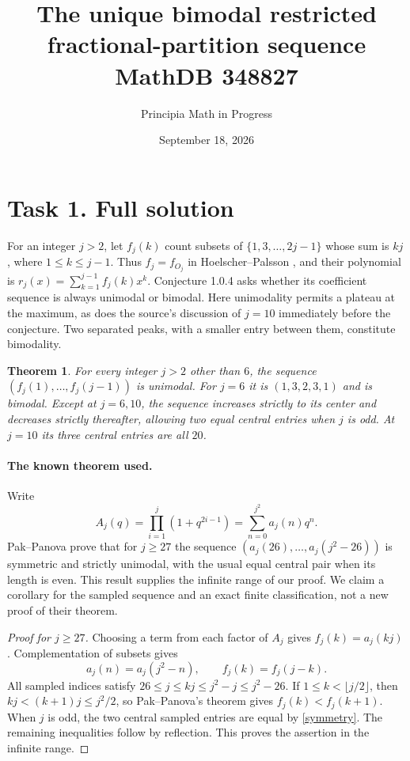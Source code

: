 \documentclass[11pt]{article}
\title{The unique bimodal restricted fractional-partition sequence\\
\large MathDB 348827}
\author{Principia Math in Progress}
\date{September 18, 2026}
\newtheorem{theorem}{Theorem}
\begin{document}
\maketitle

\section*{Task 1. Full solution}
For an integer $j>2$, let $f_j(k)$ count subsets of
$\{1,3,\ldots,2j-1\}$ whose sum is $kj$, where $1\le k\le j-1$.
Thus $f_j=f_{O_j}$ in Hoelscher--Palsson \cite{HP}, and their polynomial is
$r_j(x)=\sum_{k=1}^{j-1}f_j(k)x^k$. Conjecture 1.0.4 asks whether its
coefficient sequence is always unimodal or bimodal.
Here unimodality permits a plateau at the maximum, as does the source's
discussion of $j=10$ immediately before the conjecture. Two separated
peaks, with a smaller entry between them, constitute bimodality.

\begin{theorem}\label{main}
For every integer $j>2$ other than $6$, the sequence
$(f_j(1),\ldots,f_j(j-1))$ is unimodal. For $j=6$ it is
$(1,3,2,3,1)$ and is bimodal.
Except at $j=6,10$, the sequence increases strictly to its center and
decreases strictly thereafter, allowing two equal central entries when
$j$ is odd. At $j=10$ its three central entries are all $20$.
\end{theorem}

\paragraph{The known theorem used.}
Write
\[
 A_j(q)=\prod_{i=1}^{j}(1+q^{2i-1})
       =\sum_{n=0}^{j^2}a_j(n)q^n.
\]
Pak--Panova \cite[Theorem 5.2]{PP} prove that for $j\ge27$ the
sequence $(a_j(26),\ldots,a_j(j^2-26))$ is symmetric and strictly
unimodal, with the usual equal central pair when its length is even.
This result supplies the infinite range of our proof. We claim a
corollary for the sampled sequence and an exact finite classification,
not a new proof of their theorem.

\begin{proof}[Proof for $j\ge27$]
Choosing a term from each factor of $A_j$ gives
$f_j(k)=a_j(kj)$. Complementation of subsets gives
\begin{equation}\label{symmetry}
 a_j(n)=a_j(j^2-n),\qquad f_j(k)=f_j(j-k).
\end{equation}
All sampled indices satisfy
$26\le j\le kj\le j^2-j\le j^2-26$.
If $1\le k<\lfloor j/2\rfloor$, then
$kj<(k+1)j\le j^2/2$, so Pak--Panova's theorem gives
$f_j(k)<f_j(k+1)$. When $j$ is odd, the two central sampled
entries are equal by \eqref{symmetry}. The remaining inequalities
follow by reflection. This proves the assertion in the infinite range.
\end{proof}
\end{document}
